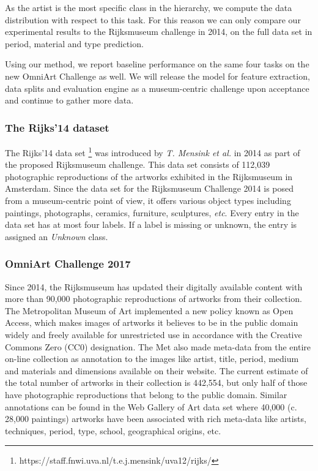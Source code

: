 \documentclass[sigconf]{acmart}
\begin{document}
As the artist is the most specific class in the hierarchy, we compute the data distribution with respect to this task. For this reason we can only compare our experimental results to the Rijksmuseum challenge in 2014, on the full data set in period, material and type prediction. 

Using our method, we report baseline performance on the same four tasks on the new OmniArt Challenge as well. We will release the model for feature extraction, data splits and evaluation engine as a museum-centric challenge upon acceptance and continue to gather more data.

\subsubsection{\textbf{The Rijks'14 dataset}}

The Rijks'14 data set \footnote{https://staff.fnwi.uva.nl/t.e.j.mensink/uva12/rijks/} was introduced by \textit{T. Mensink et al.}\cite{mensink2014rijksmuseum} in 2014 as part of the proposed Rijksmuseum challenge. This data set consists of 112,039 photographic reproductions of the artworks exhibited in the Rijksmuseum in Amsterdam. Since the data set for the Rijksmuseum Challenge 2014 is posed from a museum-centric point of view, it offers various object types including paintings, photographs, ceramics, furniture, sculptures, \textit{etc}. Every entry in the data set has at most four labels. If a label is missing or unknown, the entry is assigned an \textit{Unknown} class.

\subsubsection{\textbf{OmniArt Challenge 2017}}

Since 2014, the Rijksmuseum has updated their digitally available content with more than 90,000 photographic reproductions of artworks from their collection. The Metropolitan Museum of Art implemented a new policy known as Open Access, which makes images of artworks it believes to be in the public domain widely and freely available for unrestricted use in accordance with the Creative Commons Zero (CC0) designation. The Met also made meta-data from the entire on-line collection as annotation to the images like artist, title, period, medium and materials and dimensions available on their website. The current estimate of the total number of artworks in their collection is 442,554, but only half of those have photographic reproductions that belong to the public domain. Similar annotations can be found in the Web Gallery of Art data set where 40,000 (c. 28,000 paintings) artworks have been associated with rich meta-data like artists, techniques, period, type, school, geographical origins, etc.
\end{document}
